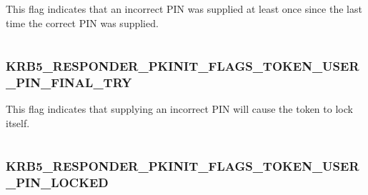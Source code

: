 \documentclass[letterpaper,10pt,english]{sphinxmanual}
\begin{document}
This flag indicates that an incorrect PIN was supplied at least once since the last time the correct PIN was supplied.

\begin{tabulary}{\linewidth}{|L|L|}
\hline

 & 
\\\hline
\end{tabulary}



\subsubsection{KRB5\_RESPONDER\_PKINIT\_FLAGS\_TOKEN\_USER\_PIN\_FINAL\_TRY}
\label{appdev/refs/macros/KRB5_RESPONDER_PKINIT_FLAGS_TOKEN_USER_PIN_FINAL_TRY:krb5-responder-pkinit-flags-token-user-pin-final-try}\label{appdev/refs/macros/KRB5_RESPONDER_PKINIT_FLAGS_TOKEN_USER_PIN_FINAL_TRY::doc}\label{appdev/refs/macros/KRB5_RESPONDER_PKINIT_FLAGS_TOKEN_USER_PIN_FINAL_TRY:krb5-responder-pkinit-flags-token-user-pin-final-try-data}

\begin{fulllineitems}
\label{appdev/refs/macros/KRB5_RESPONDER_PKINIT_FLAGS_TOKEN_USER_PIN_FINAL_TRY:KRB5_RESPONDER_PKINIT_FLAGS_TOKEN_USER_PIN_FINAL_TRY}
\end{fulllineitems}


This flag indicates that supplying an incorrect PIN will cause the token to lock itself.

\begin{tabulary}{\linewidth}{|L|L|}
\hline

 & 
\\\hline
\end{tabulary}



\subsubsection{KRB5\_RESPONDER\_PKINIT\_FLAGS\_TOKEN\_USER\_PIN\_LOCKED}
\label{appdev/refs/macros/KRB5_RESPONDER_PKINIT_FLAGS_TOKEN_USER_PIN_LOCKED::doc}\label{appdev/refs/macros/KRB5_RESPONDER_PKINIT_FLAGS_TOKEN_USER_PIN_LOCKED:krb5-responder-pkinit-flags-token-user-pin-locked}\label{appdev/refs/macros/KRB5_RESPONDER_PKINIT_FLAGS_TOKEN_USER_PIN_LOCKED:krb5-responder-pkinit-flags-token-user-pin-locked-data}
\end{document}
